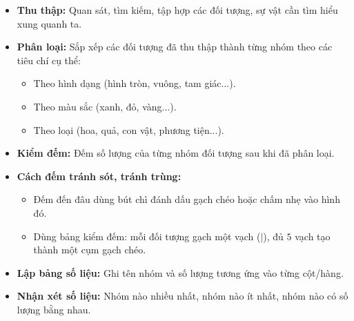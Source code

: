 \documentclass[10pt,a4paper]{article}
\begin{document}
\noindent
\begin{minipage}[t]{0.49\textwidth}\vspace{0pt}
\begin{tcolorbox}[
  enhanced,
  colback=violet!4!white,
  colframe=violet!75!black,
  arc=2mm, boxrule=0.8pt,
  left=2mm, right=2mm, top=1.8mm, bottom=1.8mm,
  title={\footnotesize\bfseries\color{white}\faKey\ 1. Các khái niệm ban đầu}
]
{\footnotesize
\begin{itemize}\setlength{\itemsep}{1pt}\setlength{\leftskip}{-2.5mm}
  \item \textbf{Thu thập:} Quan sát, tìm kiếm, tập hợp các đối tượng, sự vật cần tìm hiểu xung quanh ta.
  \item \textbf{Phân loại:} Sắp xếp các đối tượng đã thu thập thành từng nhóm theo các tiêu chí cụ thể:
  \begin{itemize}\setlength{\itemsep}{0.5pt}\setlength{\leftskip}{-2mm}
    \item Theo hình dạng (hình tròn, vuông, tam giác...).
    \item Theo màu sắc (xanh, đỏ, vàng...).
    \item Theo loại (hoa, quả, con vật, phương tiện...).
  \end{itemize}
  \item \textbf{Kiểm đếm:} Đếm số lượng của từng nhóm đối tượng sau khi đã phân loại.
\end{itemize}
}
\end{tcolorbox}
\end{minipage}
\hfill
\begin{minipage}[t]{0.49\textwidth}\vspace{0pt}
\begin{tcolorbox}[
  enhanced,
  colback=teal!4!white,
  colframe=teal!75!black,
  arc=2mm, boxrule=0.8pt,
  left=2mm, right=2mm, top=1.8mm, bottom=1.8mm,
  title={\footnotesize\bfseries\color{white}\faSliders\ 2. Kĩ năng ghi chép số liệu}
]
{\footnotesize
\begin{itemize}\setlength{\itemsep}{1pt}\setlength{\leftskip}{-2.5mm}
  \item \textbf{Cách đếm tránh sót, tránh trùng:}
  \begin{itemize}\setlength{\itemsep}{0.5pt}\setlength{\leftskip}{-2mm}
    \item Đếm đến đâu dùng bút chì đánh dấu gạch chéo hoặc chấm nhẹ vào hình đó.
    \item Dùng bảng kiểm đếm: mỗi đối tượng gạch một vạch ($|$), đủ $5$ vạch tạo thành một cụm gạch chéo.
  \end{itemize}
  \item \textbf{Lập bảng số liệu:} Ghi tên nhóm và số lượng tương ứng vào từng cột/hàng.
  \item \textbf{Nhận xét số liệu:} Nhóm nào nhiều nhất, nhóm nào ít nhất, nhóm nào có số lượng bằng nhau.
\end{itemize}
}
\end{tcolorbox}
\end{minipage}
\end{document}
